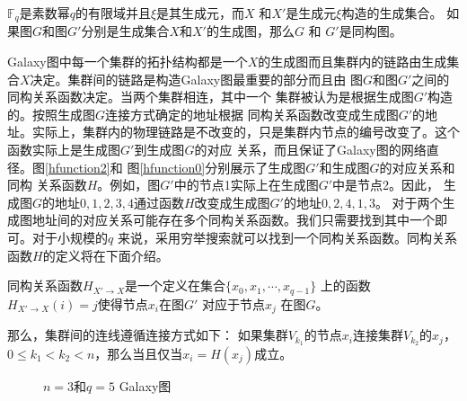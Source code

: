 \begin{lemma}\label{thm:generator-graph}
$\mathds{F}_q$是素数幂$q$的有限域并且$\xi$是其生成元，而$X$ 和$X'$是生成元$\xi$构造的生成集合。
 如果图$G$和图$G'$分别是生成集合$X$和$X'$的生成图，那么$G$ 和
$G'$是同构图。
\end{lemma}

Galaxy图中每一个集群的拓扑结构都是一个$X$的生成图而且集群内的链路由生成集
合$X$决定。集群间的链路是构造Galaxy图最重要的部分而且由
图$G$和图$G'$之间的同构关系函数决定。当两个集群相连，其中一个
集群被认为是根据生成图$G'$构造的。按照生成图$G$连接方式确定的地址根据
同构关系函数改变成生成图$G'$的地址。实际上，集群内的物理链路是不改变的，只是集群内节点的编号改变了。这个函数实际上是生成图$G'$到生成图$G$的对应
关系，而且保证了Galaxy图的网络直径。图\ref{hfunction2}和
图\ref{hfunction0}分别展示了生成图$G'$和生成图$G$的对应关系和同构
关系函数$H$。例如，图$G'$中的节点1实际上在生成图$G'$中是节点2。因此，
生成图$G$的地址${0,1,2,3,4}$通过函数$H$改变成生成图$G'$的地址${0,2,4,1,3}$。
对于两个生成图地址间的对应关系可能存在多个同构关系函数。我们只需要找到其中一个即可。对于小规模的$q$
来说，采用穷举搜索就可以找到一个同构关系函数。同构关系函数$H$的定义将在下面介绍。

\begin{definition}
同构关系函数$H_{X' \rightarrow X}$是一个定义在集合$\{x_{0}, x_{1}, \cdots, x_{q-1}\}$
上的函数$H_{X' \rightarrow X}(i) = j$使得节点$x_i$在图$G'$ 对应于节点$x_j$ 在图$G$。
\end{definition}

那么，集群间的连线遵循连接方式如下：
如果集群$V_{k_{1}}$的节点$x_{i}$连接集群$V_{k_{2}}$的$x_{j}$， $0 \le k_{1}<k_{2}< n$，那么当且仅当$x_{i}=H(x_{j})$成立。


\begin{figure}[htp]
  \centering
   \begin{minipage}[t]{\textwidth}
   \centering
  \caption{$n=3$和$q=5$ Galaxy图}
  \label{hfunction}
    \end{minipage}
\end{figure}

